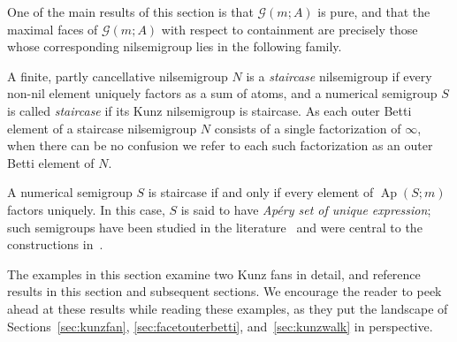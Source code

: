 \documentclass[ALCO, Unicode]{cedram}
\DeclareMathOperator\Ap{Ap}
\begin{document}
One of the main results of this section is that $\mathcal G(m;A)$ is pure, and that the maximal faces of $\mathcal G(m;A)$ with respect to containment are precisely those whose corresponding nilsemigroup lies in the following family.  

\begin{defi}\label{d:staircaseposet}
A finite, partly cancellative nilsemigroup $N$ is a \emph{staircase} nilsemigroup if every non-nil element uniquely factors as a sum of atoms, and a numerical semigroup $S$ is called \emph{staircase} if its Kunz nilsemigroup is staircase.  As each outer Betti element of a staircase nilsemigroup $N$ consists of a single factorization of $\infty$, when there can be no confusion we refer to each such factorization as an outer Betti element of $N$.  
\end{defi}

A numerical semigroup $S$ is staircase if and only if every element of $\Ap(S;m)$ factors uniquely.  
In this case, $S$ is said to have \emph{Ap\'ery set of unique expression}; such semigroups have been studied in the literature~\cite{rosalesapery} and were central to the constructions in~\cite{minprescard}.  

The examples in this section examine two Kunz fans in detail, and reference results in this section and subsequent sections.  We encourage the reader to peek ahead at these results while reading these examples, as they put the landscape of Sections~\ref{sec:kunzfan}, \ref{sec:facetouterbetti}, and~\ref{sec:kunzwalk} in perspective.  
\end{document}
